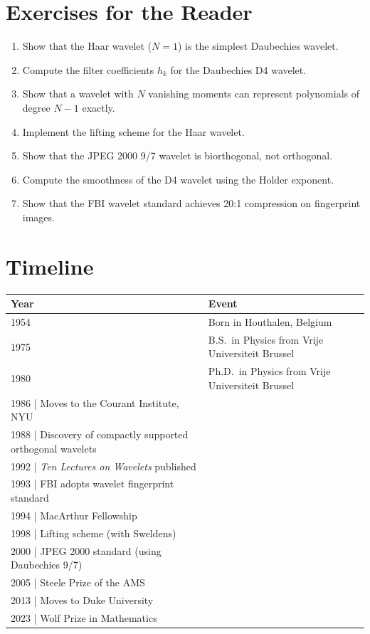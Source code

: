 \section*{Exercises for the Reader}

\begin{enumerate}
    \item [B] Show that the Haar wavelet ($N=1$) is the simplest Daubechies wavelet.
    \item [I] Compute the filter coefficients $h_k$ for the Daubechies D4 wavelet.
    \item [I] Show that a wavelet with $N$ vanishing moments can represent polynomials of degree $N-1$ exactly.
    \item [B] Implement the lifting scheme for the Haar wavelet.
    \item [I] Show that the JPEG 2000 9/7 wavelet is biorthogonal, not orthogonal.
    \item [A] Compute the smoothness of the D4 wavelet using the Holder exponent.
    \item [B] Show that the FBI wavelet standard achieves 20:1 compression on fingerprint images.
\end{enumerate}

\section*{Timeline}

\begin{tabularx}{\linewidth}{|p{1.5cm}|>{\raggedright\arraybackslash}X|}
\hline
\textbf{Year} & \textbf{Event} \\ \hline
1954 & Born in Houthalen, Belgium \\ \hline
1975 & B.S.\ in Physics from Vrije Universiteit Brussel \\ \hline
1980 & Ph.D.\ in Physics from Vrije Universiteit Brussel \\ \hline
1986 | Moves to the Courant Institute, NYU \\ \hline
1988 | Discovery of compactly supported orthogonal wavelets \\ \hline
1992 | \textit{Ten Lectures on Wavelets} published \\ \hline
1993 | FBI adopts wavelet fingerprint standard \\ \hline
1994 | MacArthur Fellowship \\ \hline
1998 | Lifting scheme (with Sweldens) \\ \hline
2000 | JPEG 2000 standard (using Daubechies 9/7) \\ \hline
2005 | Steele Prize of the AMS \\ \hline
2013 | Moves to Duke University \\ \hline
2023 | Wolf Prize in Mathematics \\ \hline
\end{tabularx}

